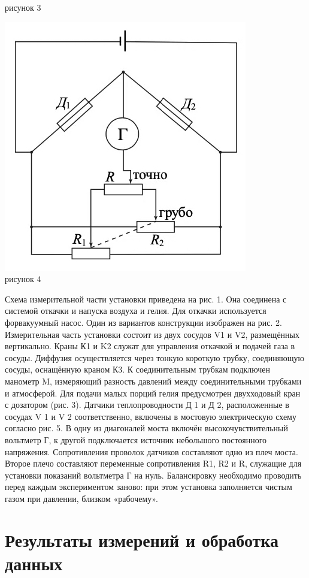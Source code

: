 \begin{center}
\begin{minipage}{0.4\textwidth}
\begin{center}
  рисунок 3
  \end{center}
    \begin{center}
    \includegraphics[width=0.5\linewidth]{4.jpg}\\

  рисунок 4
  \end{center}
\end{minipage}
\end{center}

Схема измерительной части установки приведена на рис. 1. Она соединена с системой откачки и напуска воздуха и гелия. Для откачки используется форвакуумный насос. Один из вариантов конструкции изображен на рис. 2. Измерительная часть установки состоит из двух сосудов V1 и V2, размещённых вертикально. Краны К1 и K2 служат для управления откачкой и подачей газа в сосуды. Диффузия осуществляется через тонкую короткую трубку, соединяющую сосуды, оснащённую краном К3. К соединительным трубкам подключен манометр M, измеряющий разность давлений между соединительными трубками и атмосферой. Для подачи малых порций гелия предусмотрен двухходовый кран с дозатором (рис. 3). Датчики теплопроводности Д 1 и Д 2, расположенные в сосудах V 1 и V 2 соответственно, включены в мостовую электрическую схему согласно рис. 5. В одну из диагоналей моста включён высокочувствительный вольтметр Г, к другой подключается источник небольшого постоянного напряжения. Сопротивления проволок датчиков составляют одно из плеч моста. Второе плечо составляют переменные сопротивления R1, R2 и R, служащие для установки показаний вольтметра Г на нуль. Балансировку необходимо проводить перед каждым экспериментом заново: при этом установка заполняется чистым газом при давлении, близком «рабочему».
\section{Результаты измерений и обработка данных}

